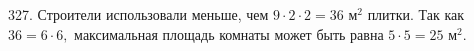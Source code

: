 327. Строители использовали меньше, чем $9\cdot2\cdot2=36\text{ м}^2$ плитки. Так как $36=6\cdot6,$ максимальная площадь комнаты может быть равна $5\cdot5=25\text{ м}^2.$\\
